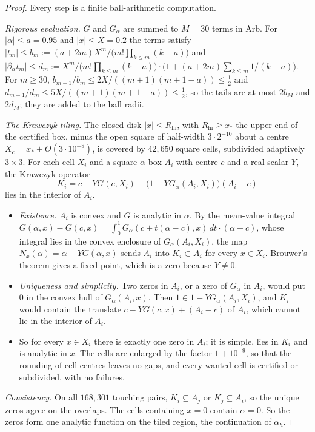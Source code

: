 \begin{proof}
Every step is a finite ball-arithmetic computation.

\emph{Rigorous evaluation.} $G$ and $G_\alpha$ are summed to $M=30$ terms in Arb. For $|\alpha|\le a=0.95$ and $|x|\le X=0.2$ the terms satisfy $|t_m|\le b_m:=(a+2m)X^m/\bigl(m!\prod_{k\le m}(k-a)\bigr)$ and $|\partial_\alpha t_m|\le d_m:=X^m/\bigl(m!\prod_{k\le m}(k-a)\bigr)\cdot\bigl(1+(a+2m)\sum_{k\le m}1/(k-a)\bigr)$. For $m\ge30$, $b_{m+1}/b_m\le2X/((m+1)(m+1-a))\le\frac12$ and $d_{m+1}/d_m\le5X/((m+1)(m+1-a))\le\frac12$, so the tails are at most $2b_M$ and $2d_M$; they are added to the ball radii.

\emph{The Krawczyk tiling.} The closed disk $|x|\le R_{\mathrm{hi}}$, with $R_{\mathrm{hi}}\ge x_*$ the upper end of the certified box, minus the open square of half-width $3\cdot2^{-10}$ about a centre $X_c=x_*+O(3\cdot10^{-8})$, is covered by $42{,}650$ square cells, subdivided adaptively $3\times3$. For each cell $X_i$ and a square $\alpha$-box $A_i$ with centre $c$ and a real scalar $Y$, the Krawczyk operator
\[
K_i=c-YG(c,X_i)+\bigl(1-YG_\alpha(A_i,X_i)\bigr)(A_i-c)
\]
lies in the interior of $A_i$.
\begin{itemize}
\item \emph{Existence.} $A_i$ is convex and $G$ is analytic in $\alpha$. By the mean-value integral $G(\alpha,x)-G(c,x)=\int_0^1G_\alpha(c+t(\alpha-c),x)\,dt\cdot(\alpha-c)$, whose integral lies in the convex enclosure of $G_\alpha(A_i,X_i)$, the map $N_x(\alpha)=\alpha-YG(\alpha,x)$ sends $A_i$ into $K_i\subset A_i$ for every $x\in X_i$. Brouwer's theorem gives a fixed point, which is a zero because $Y\ne0$.
\item \emph{Uniqueness and simplicity.} Two zeros in $A_i$, or a zero of $G_\alpha$ in $A_i$, would put $0$ in the convex hull of $G_\alpha(A_i,x)$. Then $1\in1-YG_\alpha(A_i,X_i)$, and $K_i$ would contain the translate $c-YG(c,x)+(A_i-c)$ of $A_i$, which cannot lie in the interior of $A_i$.
\item So for every $x\in X_i$ there is exactly one zero in $A_i$; it is simple, lies in $K_i$ and is analytic in $x$. The cells are enlarged by the factor $1+10^{-9}$, so that the rounding of cell centres leaves no gaps, and every wanted cell is certified or subdivided, with no failures.
\end{itemize}

\emph{Consistency.} On all $168{,}301$ touching pairs, $K_i\subseteq A_j$ or $K_j\subseteq A_i$, so the unique zeros agree on the overlaps. The cells containing $x=0$ contain $\alpha=0$. So the zeros form one analytic function on the tiled region, the continuation of $\alpha_h$.


\end{proof}
